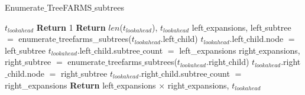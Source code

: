 \begin{algorithm}[H]
\caption{Enumerate$\_$TreeFARMS$\_$subtrees}
\label{alg::enumerate_treefarms}
\begin{algorithmic}[1]
\REQUIRE $t_{lookahead}$ \COMMENT{\textcolor{commentgreen}{Lookahed prefix with TreeFARMS objects attached to leaves}}
    \STATE \textbf{Return} 1
    \STATE \textbf{Return} $len$($t_{lookahead}$), $t_{lookahead}$
\ENDIF
\STATE left$\_$expansions, left$\_$subtree $=$ enumerate$\_$treefarms\_subtrees($t_{lookahead}$.left$\_$child)
\STATE $t_{lookahead}$.left$\_$child.node $=$ left$\_$subtree
\STATE $t_{lookahead}$.left$\_$child.subtree$\_$count $=$ left\_expansions
\STATE right$\_$expansions, right$\_$subtree $=$ enumerate$\_$treefarms$\_$subtrees($t_{lookahead}$.right$\_$child)
\STATE $t_{lookahead}$.right$\_$child.node $=$ right$\_$subtree
\STATE $t_{lookahead}$.right$\_$child.subtree$\_$count $=$ right\_expansions
\STATE \textbf{Return} left$\_$expansions $\times$ right$\_$expansions, $t_{lookahead}$ \COMMENT{\textcolor{commentgreen}{Total number of subtrees = cross product of left and right subtree count}}
\end{algorithmic}
\end{algorithm}
